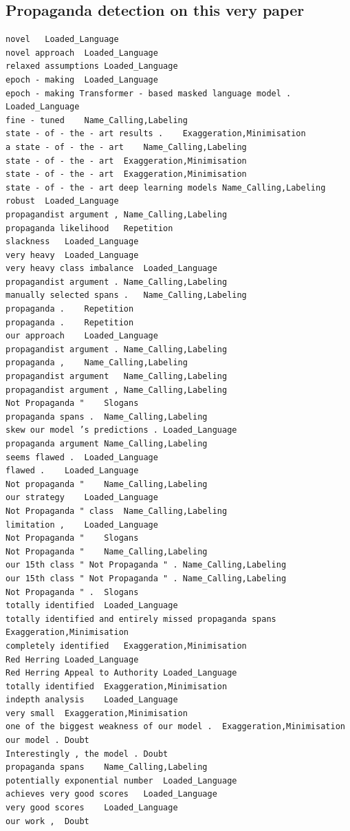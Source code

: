\documentclass[11pt]{article}
\begin{document}
\begin{appendices}
\subsection{Propaganda detection on this very paper}
\footnotesize
\begin{verbatim}
novel	Loaded_Language
novel approach	Loaded_Language
relaxed assumptions	Loaded_Language
epoch - making	Loaded_Language
epoch - making Transformer - based masked language model .	Loaded_Language
fine - tuned	Name_Calling,Labeling
state - of - the - art results .	Exaggeration,Minimisation
a state - of - the - art	Name_Calling,Labeling
state - of - the - art	Exaggeration,Minimisation
state - of - the - art	Exaggeration,Minimisation
state - of - the - art deep learning models	Name_Calling,Labeling
robust	Loaded_Language
propagandist argument ,	Name_Calling,Labeling
propaganda likelihood	Repetition
slackness	Loaded_Language
very heavy	Loaded_Language
very heavy class imbalance	Loaded_Language
propagandist argument .	Name_Calling,Labeling
manually selected spans .	Name_Calling,Labeling
propaganda .	Repetition
propaganda .	Repetition
our approach	Loaded_Language
propagandist argument .	Name_Calling,Labeling
propaganda ,	Name_Calling,Labeling
propagandist argument	Name_Calling,Labeling
propagandist argument ,	Name_Calling,Labeling
Not Propaganda "	Slogans
propaganda spans .	Name_Calling,Labeling
skew our model ’s predictions .	Loaded_Language
propaganda argument	Name_Calling,Labeling
seems flawed .	Loaded_Language
flawed .	Loaded_Language
Not propaganda "	Name_Calling,Labeling
our strategy	Loaded_Language
Not Propaganda " class	Name_Calling,Labeling
limitation ,	Loaded_Language
Not Propaganda "	Slogans
Not Propaganda "	Name_Calling,Labeling
our 15th class " Not Propaganda " .	Name_Calling,Labeling
our 15th class " Not Propaganda " .	Name_Calling,Labeling
Not Propaganda " .	Slogans
totally identified	Loaded_Language
totally identified and entirely missed propaganda spans	Exaggeration,Minimisation
completely identified	Exaggeration,Minimisation
Red Herring	Loaded_Language
Red Herring Appeal to Authority	Loaded_Language
totally identified	Exaggeration,Minimisation
indepth analysis	Loaded_Language
very small	Exaggeration,Minimisation
one of the biggest weakness of our model .	Exaggeration,Minimisation
our model .	Doubt
Interestingly , the model .	Doubt
propaganda spans	Name_Calling,Labeling
potentially exponential number	Loaded_Language
achieves very good scores	Loaded_Language
very good scores	Loaded_Language
our work ,	Doubt

\end{verbatim}

\end{appendices}
\end{document}
